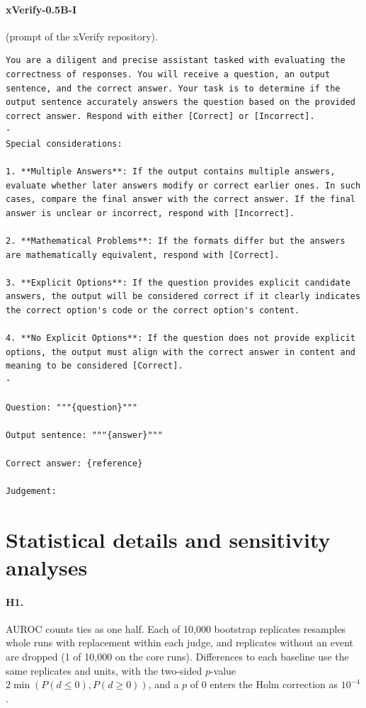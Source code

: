 \documentclass[11pt]{article}
\begin{document}
\par\addvspace{2ex}\noindent\begin{minipage}{\columnwidth}
\paragraph{xVerify-0.5B-I} (prompt of the xVerify repository).
\begin{Verbatim}[breaklines, breakanywhere, fontsize=\scriptsize, frame=single]
You are a diligent and precise assistant tasked with evaluating the correctness of responses. You will receive a question, an output sentence, and the correct answer. Your task is to determine if the output sentence accurately answers the question based on the provided correct answer. Respond with either [Correct] or [Incorrect].
-
Special considerations:

1. **Multiple Answers**: If the output contains multiple answers, evaluate whether later answers modify or correct earlier ones. In such cases, compare the final answer with the correct answer. If the final answer is unclear or incorrect, respond with [Incorrect].

2. **Mathematical Problems**: If the formats differ but the answers are mathematically equivalent, respond with [Correct].

3. **Explicit Options**: If the question provides explicit candidate answers, the output will be considered correct if it clearly indicates the correct option's code or the correct option's content.

4. **No Explicit Options**: If the question does not provide explicit options, the output must align with the correct answer in content and meaning to be considered [Correct].
-

Question: """{question}"""

Output sentence: """{answer}"""

Correct answer: {reference}

Judgement:
\end{Verbatim}
\end{minipage}

\section{Statistical details and sensitivity analyses}
\label{app:stats}

\paragraph{H1.} AUROC counts ties as one half. Each of 10,000 bootstrap replicates resamples whole runs with
replacement within each judge, and replicates without an event are dropped (1 of 10,000 on the core runs). Differences to
each baseline use the same replicates and units, with the two-sided $p$-value $2\min(P(d \le 0), P(d \ge 0))$, and a
$p$ of 0 enters the Holm correction as $10^{-4}$.
\end{document}
